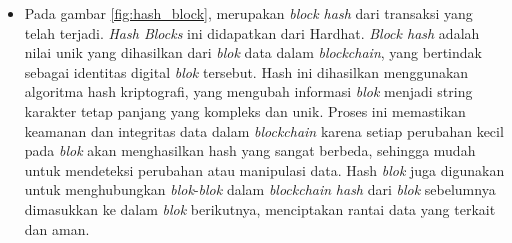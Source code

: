 \begin{itemize}
    \item Pada gambar \ref*{fig:hash_block}, merupakan \emph{block hash} dari transaksi yang telah terjadi. \emph{Hash Blocks} ini didapatkan dari Hardhat. \emph{Block hash} adalah nilai unik yang dihasilkan dari \emph{blok} data dalam \emph{blockchain}, yang bertindak sebagai identitas digital \emph{blok} tersebut. Hash ini dihasilkan menggunakan algoritma hash kriptografi, yang mengubah informasi \emph{blok} menjadi string karakter tetap panjang yang kompleks dan unik. Proses ini memastikan keamanan dan integritas data dalam \emph{blockchain} karena setiap perubahan kecil pada \emph{blok} akan menghasilkan hash yang sangat berbeda, sehingga mudah untuk mendeteksi perubahan atau manipulasi data. Hash \emph{blok} juga digunakan untuk menghubungkan \emph{blok}-\emph{blok} dalam \emph{blockchain} \emph{hash} dari \emph{blok} sebelumnya dimasukkan ke dalam \emph{blok} berikutnya, menciptakan rantai data yang terkait dan aman.
\end{itemize}